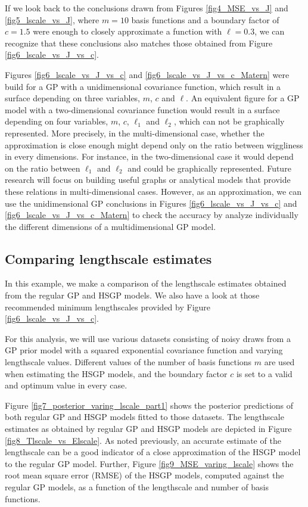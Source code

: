 \documentclass[onecolumn,a4paper,11pt]{article}
\begin{document}
If we look back to the conclusions drawn from Figures \ref{fig4_MSE_vs_J} and \ref{fig5_lscale_vs_J}, where $m = 10$ basis functions and a boundary factor of $c = 1.5$ were enough to closely approximate a function with $\ell = 0.3$, we can recognize that these conclusions also matches those obtained from Figure \ref{fig6_lscale_vs_J_vs_c}.

Figures \ref{fig6_lscale_vs_J_vs_c} and \ref{fig6_lscale_vs_J_vs_c_Matern} were build for a GP with a unidimensional covariance function, which result in a surface depending on three variables, $m$, $c$ and $\ell$. An equivalent figure for a GP model with a two-dimensional covariance function would result in a surface depending on four variables, $m$, $c$, $\ell_1$ and $\ell_2$, which can not be graphically represented. More precisely, in the multi-dimensional case, whether the approximation is close enough might depend only on the ratio between wiggliness in every dimensions. For instance, in the two-dimensional case it would depend on the ratio between $\ell_1$ and $\ell_2$ and could be graphically represented. Future research will focus on building useful graphs or analytical models that provide these relations in multi-dimensional cases. However, as an approximation, we can use the unidimensional GP conclusions in Figures \ref{fig6_lscale_vs_J_vs_c} and \ref{fig6_lscale_vs_J_vs_c_Matern} to check the accuracy by analyze individually the different dimensions of a multidimensional GP model.

\subsection{Comparing lengthscale estimates}

In this example, we make a comparison of the lengthscale estimates
obtained from the regular GP and HSGP models. We also have a look at those recommended minimum lengthscales provided by Figure \ref{fig6_lscale_vs_J_vs_c}.

For this analysis, we will use various datasets consisting of noisy draws from a GP prior model with a squared exponential covariance function and varying lengthscale values. Different values of the number of basis functions $m$ are used when estimating the HSGP models, and the boundary factor $c$ is set to a valid and optimum value in every case. 

Figure \ref{fig7_posterior_varing_lscale_part1} shows the posterior predictions of both regular GP and HSGP models fitted to those datasets. The lengthscale estimates as obtained by regular GP and HSGP models are depicted in Figure \ref{fig8_Tlscale_vs_Elscale}. As noted previously, an accurate estimate of the lengthscale can be a good indicator of a close approximation of the HSGP model to the regular GP model. Further, Figure \ref{fig9_MSE_varing_lscale} shows the root mean square error (RMSE) of the HSGP models, computed against the regular GP models, as a function of the lengthscale and number of basis functions.
\end{document}

